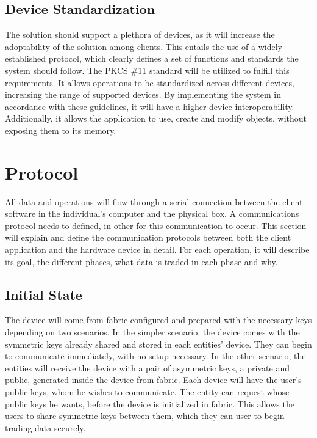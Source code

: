 \subsection{Device Standardization}\label{chap:implementation:tools:standardization}

The solution should support a plethora of devices, as it will increase the adoptability of the solution among clients. This entails the use of a widely established protocol, which clearly defines a set of functions and standards the system should follow.
The \ac{PKCS} \#11 standard will be utilized to fulfill this requirements. It allows operations to be standardized across different devices, increasing the range of supported devices. By implementing the system in accordance with these guidelines, it will have a higher device interoperability. Additionally, it allows the application to use, create and modify objects, without exposing them to its memory.

\section{Protocol}\label{chap:implementation:protocol}

All data and operations will flow through a serial connection between the client software in the individual's computer and the physical box. A communications protocol needs to defined, in other for this communication to occur.
This section will explain and define the communication protocols between both the client application and the hardware device in detail. For each operation, it will describe its goal, the different phases, what data is traded in each phase and why.

\subsection{Initial State}\label{chap:implementation:protocol:initial-state}

The device will come from fabric configured and prepared with the necessary keys depending on two scenarios. In the simpler scenario, the device comes with the symmetric keys already shared and stored in each entities' device. They can begin to communicate immediately, with no setup necessary.
In the other scenario, the entities will receive the device with a pair of asymmetric keys, a private and public, generated inside the device from fabric. Each device will have the user's public keys, whom he wishes to communicate. The entity can request whose public keys he wants, before the device is initialized in fabric. This allows the users to share symmetric keys between them, which they can user to begin trading data securely.

